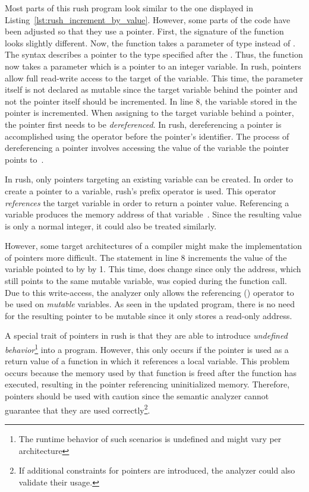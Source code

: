Most parts of this rush program look similar to the one displayed in Listing~\ref{lst:rush_increment_by_value}.
However, some parts of the code have been adjusted so that they use a pointer.
First, the signature of the  function looks slightly different.
Now, the function takes a parameter of type  instead of .
The syntax  describes a pointer to the type specified after the \qVerb{*}.
Thus, the function now takes a parameter which is a pointer to an integer variable.
In rush, pointers allow full read-write access to the target of the variable.
This time, the parameter itself is not declared as mutable since the target variable behind the pointer and not the pointer itself should be incremented.
In line 8, the variable stored in the pointer is incremented.
When assigning to the target variable behind a pointer, the pointer first needs to be \emph{dereferenced}.
In rush, dereferencing a pointer is accomplished using the \qVerb{*} operator before the pointer's identifier.
The process of dereferencing a pointer involves accessing the value of the variable the pointer points to~\cite[p.~94]{Ritchie1988}.

In rush, only pointers targeting an existing variable can be created.
In order to create a pointer to a variable, rush's \qVerb{&} prefix operator is used.
This operator \emph{references} the target variable in order to return a pointer value.
Referencing a variable produces the memory address of that variable~\cite[p.~95]{Ritchie1988}.
Since the resulting value is only a normal integer, it could also be treated similarly.

However, some target architectures of a compiler might make the implementation of pointers more difficult.
The statement in line 8 increments the value of the variable pointed to by  by 1.
This time,  does change since only the address, which still points to the same mutable variable, was copied during the function call.
Due to this write-access, the analyzer only allows the referencing (\qVerb{&}) operator to be used on \emph{mutable} variables.
As seen in the updated program, there is no need for the resulting pointer to be mutable since it only stores a read-only address.

A special trait of pointers in rush is that they are able to introduce \emph{undefined behavior}\footnote{The runtime behavior of such scenarios is undefined and might vary per architecture} into a program.
However, this only occurs if the pointer is used as a return value of a function in which it references a local variable.
This problem occurs because the memory used by that function is freed after the function has executed, resulting in the pointer referencing uninitialized memory.
Therefore, pointers should be used with caution since the semantic analyzer cannot guarantee that they are used correctly\footnote{If additional constraints for pointers are introduced, the analyzer could also validate their usage.}.


